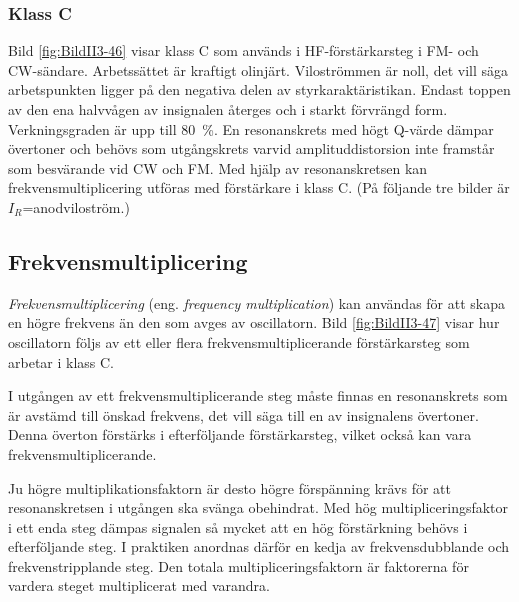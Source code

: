 \subsubsection{Klass C}


Bild \ref{fig:BildII3-46} visar klass C som används i HF-förstärkarsteg i
FM- och CW-sändare.
Arbetssättet är kraftigt olinjärt.
Viloströmmen är noll, det vill säga arbetspunkten ligger på den negativa delen
av styrkaraktäristikan.
Endast toppen av den ena halvvågen av insignalen återges och i starkt
förvrängd form.
Verkningsgraden är upp till 80~\%.
En resonanskrets med högt Q-värde dämpar övertoner och behövs som utgångskrets
varvid amplituddistorsion inte framstår som besvärande vid CW och FM.
Med hjälp av resonanskretsen kan frekvensmultiplicering utföras med
förstärkare i klass C.
(På följande tre bilder är \(I_R\)=anodviloström.)

\subsection{Frekvensmultiplicering}


\emph{Frekvensmultiplicering} (eng. \emph{frequency multiplication}) kan
användas för att skapa en högre frekvens än den som avges av oscillatorn.
Bild \ref{fig:BildII3-47} visar hur oscillatorn följs av ett eller flera
frekvensmultiplicerande förstärkarsteg som arbetar i klass C.

I utgången av ett frekvensmultiplicerande steg måste finnas en
resonanskrets som är avstämd till önskad frekvens, det vill säga till en av insignalens övertoner.
Denna överton förstärks i efterföljande förstärkarsteg, vilket också kan vara
frekvensmultiplicerande.

Ju högre multiplikationsfaktorn är desto högre förspänning krävs för
att resonanskretsen i utgången ska svänga obehindrat.
Med hög multipliceringsfaktor i ett enda steg dämpas signalen så mycket att
en hög förstärkning behövs i efterföljande steg.
I praktiken anordnas därför en kedja av frekvensdubblande och
frekvenstripplande steg.
Den totala multipliceringsfaktorn är faktorerna för vardera steget
multiplicerat med varandra.

